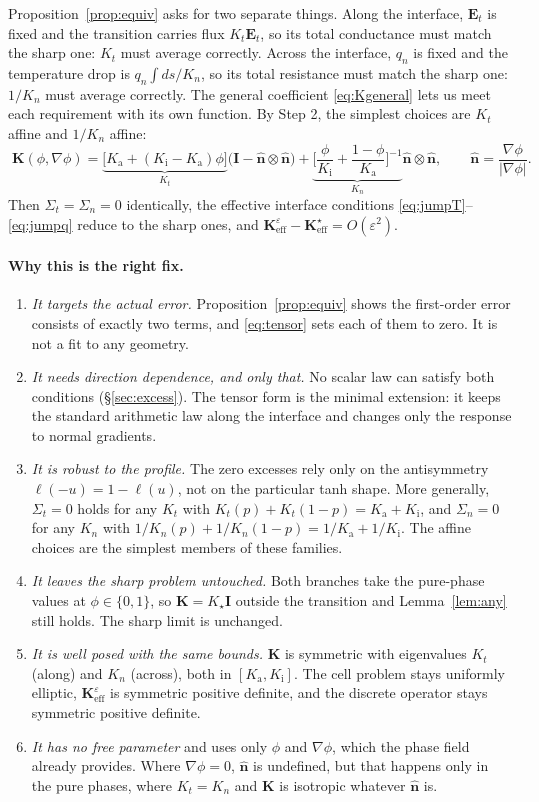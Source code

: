 \documentclass[11pt]{article}
\newcommand{\bn}{\hat{\mathbf n}}
\newcommand{\bI}{\mathbf I}
\newcommand{\bK}{\mathbf K}
\newcommand{\Keff}{\mathbf{K}_{\mathrm{eff}}}
\newcommand{\Ka}{K_{\mathrm a}}
\newcommand{\Ki}{K_{\mathrm i}}
\newcommand{\Kt}{K_{t}}
\newcommand{\Kn}{K_{n}}
\begin{document}
Proposition~\ref{prop:equiv} asks for two separate things. Along the interface,
$\mathbf E_t$ is fixed and the transition carries flux $\Kt\mathbf E_t$, so its
total conductance must match the sharp one: $\Kt$ must average correctly. Across
the interface, $q_n$ is fixed and the temperature drop is $q_n\int ds/\Kn$, so
its total resistance must match the sharp one: $1/\Kn$ must average correctly.
The general coefficient \eqref{eq:Kgeneral} lets us meet each requirement with
its own function. By Step 2, the simplest choices are $\Kt$ affine and $1/\Kn$
affine:
\begin{equation}
\boxed{\;
\bK(\phi,\nabla\phi)=\underbrace{\big[\Ka+(\Ki-\Ka)\phi\big]}_{\Kt}\big(\bI-\bn\otimes\bn\big)
+\underbrace{\Big[\frac{\phi}{\Ki}+\frac{1-\phi}{\Ka}\Big]^{-1}}_{\Kn}\bn\otimes\bn,
\qquad \bn=\frac{\nabla\phi}{|\nabla\phi|}.\;}
\label{eq:tensor}
\end{equation}
Then $\Sigma_t=\Sigma_n=0$ identically, the effective interface conditions
\eqref{eq:jumpT}--\eqref{eq:jumpq} reduce to the sharp ones, and
$\Keff^\varepsilon-\Keff^\star=O(\varepsilon^2)$.

\paragraph{Why this is the right fix.}
\begin{enumerate}
\item \emph{It targets the actual error.} Proposition~\ref{prop:equiv} shows the
first-order error consists of exactly two terms, and \eqref{eq:tensor} sets each
of them to zero. It is not a fit to any geometry.
\item \emph{It needs direction dependence, and only that.} No scalar law can
satisfy both conditions (\S\ref{sec:excess}). The tensor form is the minimal
extension: it keeps the standard arithmetic law along the interface and changes
only the response to normal gradients.
\item \emph{It is robust to the profile.} The zero excesses rely only on the
antisymmetry $\ell(-u)=1-\ell(u)$, not on the particular tanh shape. More
generally, $\Sigma_t=0$ holds for any $\Kt$ with
$\Kt(p)+\Kt(1-p)=\Ka+\Ki$, and $\Sigma_n=0$ for any $\Kn$ with
$1/\Kn(p)+1/\Kn(1-p)=1/\Ka+1/\Ki$. The affine choices are the simplest members
of these families.
\item \emph{It leaves the sharp problem untouched.} Both branches take the
pure-phase values at $\phi\in\{0,1\}$, so $\bK=K_\star\bI$ outside the
transition and Lemma~\ref{lem:any} still holds. The sharp limit is unchanged.
\item \emph{It is well posed with the same bounds.} $\bK$ is symmetric with
eigenvalues $\Kt$ (along) and $\Kn$ (across), both in $[\Ka,\Ki]$. The cell
problem stays uniformly elliptic, $\Keff^\varepsilon$ is symmetric positive
definite, and the discrete operator stays symmetric positive definite.
\item \emph{It has no free parameter} and uses only $\phi$ and $\nabla\phi$,
which the phase field already provides. Where $\nabla\phi=0$, $\bn$ is
undefined, but that happens only in the pure phases, where $\Kt=\Kn$ and $\bK$
is isotropic whatever $\bn$ is.
\end{enumerate}
\end{document}
